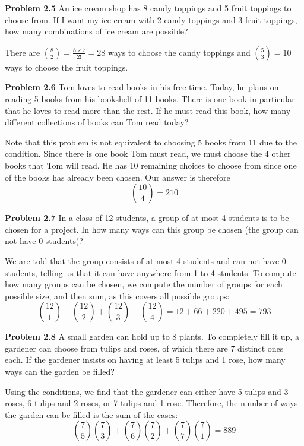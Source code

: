 \documentclass[11pt]{scrartcl}
\begin{document}
\begin{tcolorbox}
\textbf{Problem 2.5} An ice cream shop has 8 candy toppings and 5 fruit toppings to choose from. If I want my ice cream with 2 candy toppings and 3 fruit toppings, how many combinations of ice cream are possible?
\end{tcolorbox}
\noindent 
There are ${8 \choose 2}=\frac{8 \times 7}{2!}=28$
ways to choose the candy toppings and ${5 \choose 3}=10$ ways to choose the fruit toppings. 
\begin{tcolorbox}
\textbf{Problem 2.6} Tom loves to read books in his free time. Today, he plans on reading 5 books from his bookshelf of 11 books. There is one book in particular that he loves to read more than the rest. If he must read this book, how many different collections of books can Tom read today?
\end{tcolorbox}
\noindent 
Note that this problem is not equivalent to choosing 5 books from 11 due to the condition. Since there is one book Tom must read, we must choose the 4 other books that Tom will read. He has 10 remaining choices to choose from since one of the books has already been chosen. Our answer is therefore $${{10 \choose 4}}=210$$
\begin{tcolorbox}
\textbf{Problem 2.7} In a class of 12 students, a group of at most 4 students is to be chosen for a project. In how many ways can this group be chosen (the group can not have 0 students)?
\end{tcolorbox}
\noindent 
We are told that the group consists of at most 4 students and can not have 0 students, telling us that it can have anywhere from 1 to 4 students. To compute how many groups can be chosen, we compute the number of groups for each possible size, and then sum, as this covers all possible groups: 
$${12 \choose 1}+{12 \choose 2}+{12 \choose 3}+{12 \choose 4}=12+66+220+495=793$$
\begin{tcolorbox}
\textbf{Problem 2.8} A small garden can hold up to 8 plants. To completely fill it up, a gardener can choose from tulips and roses, of which there are 7 distinct ones each. If the gardener insists on having at least 5 tulips and 1 rose, how many ways can the garden be filled?  
\end{tcolorbox}
\noindent 
Using the conditions, we find that the gardener can either have 5 tulips and 3 roses, 6 tulips and 2 roses, or 7 tulips and 1 rose. Therefore, the number of ways the garden can be filled is the sum of the cases: 
$${7 \choose 5}{7 \choose 3}+{7 \choose 6}{7 \choose 2}+{7 \choose 7}{7 \choose 1}=889$$
\end{document}
